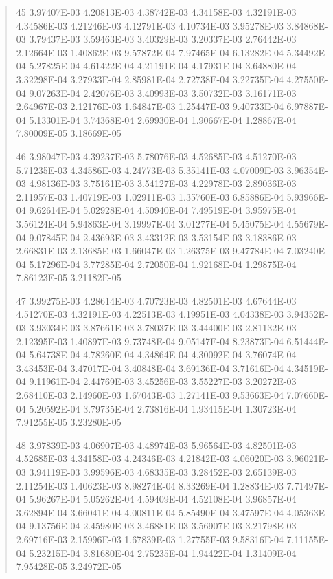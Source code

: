 \documentclass[letterpaper,10pt,english]{sphinxmanual}
\begin{document}
\begin{quote}
\begin{DUlineblock}{0em}
\item[] 45   3.97407E-03  4.20813E-03  4.38742E-03  4.34158E-03  4.32191E-03  4.34586E-03  4.21246E-03  4.12791E-03  4.10734E-03  3.95278E-03  3.84868E-03  3.79437E-03  3.59463E-03  3.40329E-03  3.20337E-03  2.76442E-03  2.12664E-03  1.40862E-03  9.57872E-04  7.97465E-04  6.13282E-04  5.34492E-04  5.27825E-04  4.61422E-04  4.21191E-04  4.17931E-04  3.64880E-04  3.32298E-04  3.27933E-04  2.85981E-04  2.72738E-04  3.22735E-04  4.27550E-04  9.07263E-04  2.42076E-03  3.40993E-03  3.50732E-03  3.16171E-03  2.64967E-03  2.12176E-03  1.64847E-03  1.25447E-03  9.40733E-04  6.97887E-04  5.13301E-04  3.74368E-04  2.69930E-04  1.90667E-04  1.28867E-04  7.80009E-05  3.18669E-05
\item[] 46   3.98047E-03  4.39237E-03  5.78076E-03  4.52685E-03  4.51270E-03  5.71235E-03  4.34586E-03  4.24773E-03  5.35141E-03  4.07009E-03  3.96354E-03  4.98136E-03  3.75161E-03  3.54127E-03  4.22978E-03  2.89036E-03  2.11957E-03  1.40719E-03  1.02911E-03  1.35760E-03  6.85886E-04  5.93966E-04  9.62614E-04  5.02928E-04  4.50940E-04  7.49519E-04  3.95975E-04  3.56124E-04  5.94863E-04  3.19997E-04  3.01277E-04  5.45075E-04  4.55679E-04  9.07845E-04  2.43693E-03  3.43312E-03  3.53154E-03  3.18386E-03  2.66831E-03  2.13685E-03  1.66047E-03  1.26375E-03  9.47784E-04  7.03240E-04  5.17296E-04  3.77285E-04  2.72050E-04  1.92168E-04  1.29875E-04  7.86123E-05  3.21182E-05
\item[] 47   3.99275E-03  4.28614E-03  4.70723E-03  4.82501E-03  4.67644E-03  4.51270E-03  4.32191E-03  4.22513E-03  4.19951E-03  4.04338E-03  3.94352E-03  3.93034E-03  3.87661E-03  3.78037E-03  3.44400E-03  2.81132E-03  2.12395E-03  1.40897E-03  9.73748E-04  9.05147E-04  8.23873E-04  6.51444E-04  5.64738E-04  4.78260E-04  4.34864E-04  4.30092E-04  3.76074E-04  3.43453E-04  3.47017E-04  3.40848E-04  3.69136E-04  3.71616E-04  4.34519E-04  9.11961E-04  2.44769E-03  3.45256E-03  3.55227E-03  3.20272E-03  2.68410E-03  2.14960E-03  1.67043E-03  1.27141E-03  9.53663E-04  7.07660E-04  5.20592E-04  3.79735E-04  2.73816E-04  1.93415E-04  1.30723E-04  7.91255E-05  3.23280E-05
\item[] 48   3.97839E-03  4.06907E-03  4.48974E-03  5.96564E-03  4.82501E-03  4.52685E-03  4.34158E-03  4.24346E-03  4.21842E-03  4.06020E-03  3.96021E-03  3.94119E-03  3.99596E-03  4.68335E-03  3.28452E-03  2.65139E-03  2.11254E-03  1.40623E-03  8.98274E-04  8.33269E-04  1.28834E-03  7.71497E-04  5.96267E-04  5.05262E-04  4.59409E-04  4.52108E-04  3.96857E-04  3.62894E-04  3.66041E-04  4.00811E-04  5.85490E-04  3.47597E-04  4.05363E-04  9.13756E-04  2.45980E-03  3.46881E-03  3.56907E-03  3.21798E-03  2.69716E-03  2.15996E-03  1.67839E-03  1.27755E-03  9.58316E-04  7.11155E-04  5.23215E-04  3.81680E-04  2.75235E-04  1.94422E-04  1.31409E-04  7.95428E-05  3.24972E-05

\end{DUlineblock}
\end{quote}
\end{document}
